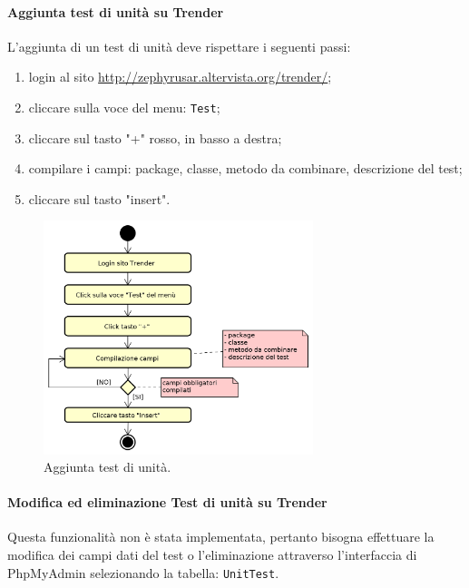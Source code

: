 		\paragraph{Aggiunta test di unità su Trender} \label{sec:traccTuni}
		L'aggiunta di un test di unità deve rispettare i seguenti passi:
		\begin{enumerate}
			\item login al sito \url{http://zephyrusar.altervista.org/trender/};
			\item cliccare sulla voce del menu: \texttt{Test};
			\item cliccare sul tasto "+" rosso, in basso a destra;
			\item compilare i campi: package, classe, metodo da combinare, descrizione del test;
			\item cliccare sul tasto "insert".
		\end{enumerate}
		\begin{figure}[H]
			\centering
			\includegraphics[width=0.7\textwidth]{img/AggiuntaTestUnit}
			\caption{Aggiunta test di unità.}
		\end{figure}

		\paragraph{Modifica ed eliminazione Test di unità su Trender}
		Questa funzionalità non è stata implementata, pertanto bisogna effettuare la modifica dei campi dati del test o l'eliminazione attraverso l'interfaccia di PhpMyAdmin selezionando la tabella: \texttt{UnitTest}.
		
